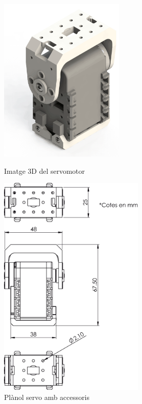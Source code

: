\documentclass[a4paper, 12pt]{article}
\begin{document}
\begin{figure}[h!]
\centering
\begin{minipage}[b]{0.45\linewidth}
\centering
\includegraphics[width=6cm]{./imgComp/servo}
\caption{Imatge 3D del servomotor}
\end{minipage}
\begin{minipage}[b]{0.45\linewidth}
\centering
\includegraphics[width=7cm]{./sketch/servo}
\caption{Plànol servo amb accessoris}
\end{minipage}
\end{figure}
\end{document}
